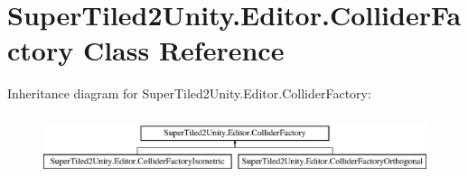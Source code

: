 \hypertarget{class_super_tiled2_unity_1_1_editor_1_1_collider_factory}{}\section{Super\+Tiled2\+Unity.\+Editor.\+Collider\+Factory Class Reference}
\label{class_super_tiled2_unity_1_1_editor_1_1_collider_factory}
Inheritance diagram for Super\+Tiled2\+Unity.\+Editor.\+Collider\+Factory\+:\begin{figure}[H]
\begin{center}
\leavevmode
\includegraphics[height=1.818182cm]{class_super_tiled2_unity_1_1_editor_1_1_collider_factory}
\end{center}
\end{figure}
